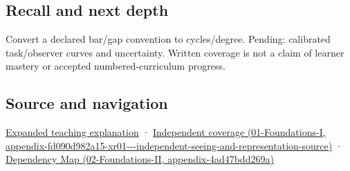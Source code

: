 \subsection{Recall and next depth}\label{appendix-b491fc48c54b-recall-and-next-depth}

Convert a declared bar/gap convention to cycles/degree. Pending: calibrated task/observer curves and uncertainty. Written coverage is not a claim of learner mastery or accepted numbered-curriculum progress.

\subsection{Source and navigation}\label{appendix-b491fc48c54b-source-and-navigation}

\hyperref[04-visual-computing-ii-ch042-visibility-is-about-contrast-conditions-and-tasks]{Expanded teaching explanation} · \href{../01-Foundations-I/main.pdf\#nameddest=appendix-fd090d982a15-xr01---independent-seeing-and-representation-source}{Independent coverage (01-Foundations-I, appendix-fd090d982a15-xr01-\/-\/-independent-seeing-and-representation-source)} · \href{../02-Foundations-II/main.pdf\#nameddest=appendix-4ad47bdd269a}{Dependency Map (02-Foundations-II, appendix-4ad47bdd269a)}
